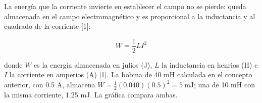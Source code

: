\documentclass[11pt,letterpaper]{article}
\begin{document}
La energía que la corriente invierte en establecer el campo no se pierde: queda almacenada en el campo electromagnético y es proporcional a la inductancia y al cuadrado de la corriente [1]:

\begin{equation}
  W = \frac{1}{2} L I^{2}
\end{equation}

donde $W$ es la energía almacenada en julios (J), $L$ la inductancia en henrios (H) e $I$ la corriente en amperios (A) [1]. La bobina de 40 mH calculada en el concepto anterior, con 0.5 A, almacena $W = \tfrac{1}{2}(0.040)(0.5)^2 = 5\ \text{mJ}$; una de 10 mH con la misma corriente, 1.25 mJ. La gráfica compara ambas.

\end{document}
